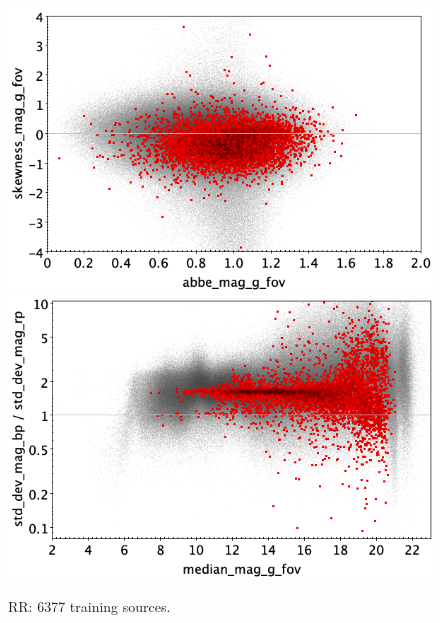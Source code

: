 \documentclass[longauth]{aa}
\begin{document}
\begin{appendix}
\begin{figure}
\vspace{4mm}
 \includegraphics[width=0.45\hsize]{figures/appendix/RR_trn_ask.png}  %
\hspace{2mm}
 \includegraphics[width=0.45\hsize]{figures/appendix/RR_trn_msdr.png}  \\ %
\vspace{4mm}
 \caption{RR: 6377 training sources.}  
 \label{fig:app:RR_trn}
\end{figure}


\end{appendix}
\end{document}
